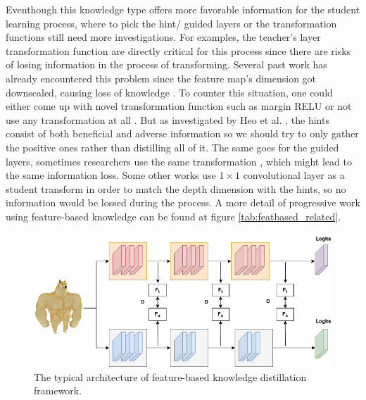 Eventhough this knowledge type offers more favorable information for the student learning process, where to pick the hint/ guided layers or the transformation functions still need more investigations. For examples, the teacher's layer transformation function are directly critical for this process since there are risks of losing information in the process of transforming. Several past work has already encountered this problem since the feature map's dimension got downscaled, causing loss of knowledge \cite{featurebased02_AT,featurebased06_meal}. To counter this situation, one could either come up with novel transformation function such as margin RELU\cite{featurebased03_relu} or not use any transformation at all \cite{featurebased01}. But as investigated by Heo et al. \cite{featurebased03_relu}, the hints consist of both beneficial and adverse information so we should try to only gather the positive ones rather than distilling all of it. The same goes for the guided layers, sometimes researchers use the same transformation \cite{featurebased02_AT}, which might lead to the same information loss. Some other works use $1 \times 1$ convolutional layer as a student transform \cite{featurebased01,featurebased03_relu} in order to match the depth dimension with the hints, so no information would be lossed during the process. A more detail of progressive work using feature-based knowledge can be found at figure \ref{tab:featbased_related}.

\begin{figure}[h!]
   \begin{center}
      \includegraphics[width=0.8\linewidth]{assets/feature_based.png}
   \end{center}
      \caption{The typical architecture of feature-based knowledge distillation framework.}
   \label{fig:feature_base}
\end{figure}